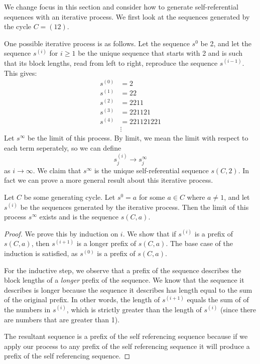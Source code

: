 \documentclass[runningheads,a4paper]{llncs}
\begin{document}
We change focus in this section and consider how to generate self-referential sequences with an iterative process. We first look at the sequences generated by the cycle $C = (1 2)$.

One possible iterative process is as follows. Let the sequence $s^0$ be 2, and let the sequence $s^{(i)}$ for $i \geq 1$ be the unique sequence that starts with 2 and is such that its block lengths, read from left to right, reproduce the sequence $s^{(i-1)}$. This gives:
\begin{align*}
s^{(0)}&= 2\\
s^{(1)} &= 22\\
s^{(2)} &= 2211\\
s^{(3)}&= 221121\\
s^{(4)} &= 221121221\\
&\vdots
\end{align*}
Let $s^\infty$ be the limit of this process. 
By limit, we mean the limit with respect to each term seperately, so we can define
\[ s^{(i)}_j \rightarrow s^\infty_j \]
as $i \rightarrow \infty$. We claim that $s^\infty$ is the unique self-referential sequence $s(C,2)$. In fact we can prove a more general result about this iterative process.

\begin{theorem}
Let $C$ be some generating cycle. Let $s^0 = a$ for some $a \in C$ where $a \neq 1$, and let $s^{(i)}$ be the sequences generated by the iterative process. Then the limit of this process $s^\infty$ exists and is the sequence $s(C,a)$.
\end{theorem}

\begin{proof}
We prove this by induction on $i$. We show that if $s^{(i)}$ is a prefix of $s(C,a)$, then $s^{(i+1)}$ is a longer prefix of $s(C,a)$. The base case of the induction is satisfied, as $s^{(0)}$ is a prefix of $s(C,a)$.

For the inductive step, we observe that a prefix of the sequence describes the block lengths of a \emph{longer} prefix of the sequence. We know that the sequence it describes is longer because the sequence it describes has length equal to the sum of the original prefix. In other words, the length of $s^{(i+1)}$ equals the sum of of the numbers in $s^{(i)}$, which is strictly greater than the length of $s^{(i)}$ (since there are numbers that are greater than 1). 

The resultant sequence is a prefix of the self referencing sequence because if we apply our process to any prefix of the self referencing sequence it will produce a prefix of the self referencing sequence.  
\end{proof}
\end{document}
